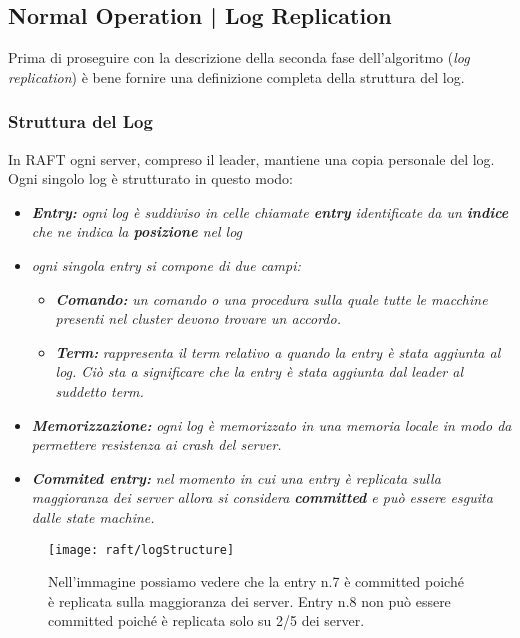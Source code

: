 \subsection{Normal Operation | Log Replication}
\label{Log Replication}
Prima di proseguire con la descrizione della seconda fase dell'algoritmo (\textit{log replication}) è bene fornire una definizione completa della struttura del log.
  \subsubsection{Struttura del Log}
  In RAFT ogni server, compreso il leader, mantiene una copia personale del log. Ogni singolo log è strutturato in questo modo:
  \begin{itemize}
    \item{\emph{\textbf{Entry:}}}
    \emph{ogni log è suddiviso in celle chiamate \textbf{entry} identificate da un \textbf{indice} che ne indica la \textbf{posizione} nel log}
    \item{\emph{ogni singola entry si compone di due campi:}}
      \begin{itemize}
        \item{\emph{\textbf{Comando:}}}
        \emph{un comando o una procedura sulla quale tutte le macchine presenti nel cluster devono trovare un accordo.}
        \item{\emph{\textbf{Term:}}}
        \emph{rappresenta il term relativo a quando la entry è stata aggiunta al log. Ciò sta a significare che la entry è stata aggiunta dal leader al suddetto term.}
      \end{itemize}
    \item{\emph{\textbf{Memorizzazione:}}}
    \emph{ogni log è memorizzato in una memoria locale in modo da permettere resistenza ai crash del server.}
    \item{\emph{\textbf{Commited entry:}}}
    \emph{nel momento in cui una entry è replicata sulla maggioranza dei server allora si considera \textbf{committed} e può essere esguita dalle state machine.}
  \end{itemize}
  \begin{figure}[H]
  	\centering
  	\texttt{[image: raft/logStructure]}
  	\caption{Nell'immagine possiamo vedere che la entry n.7 è committed poiché è replicata sulla maggioranza dei server. Entry n.8 non può essere committed poiché è replicata solo su 2/5 dei server.}
  	\label{fig:figure6}
  \end{figure}

